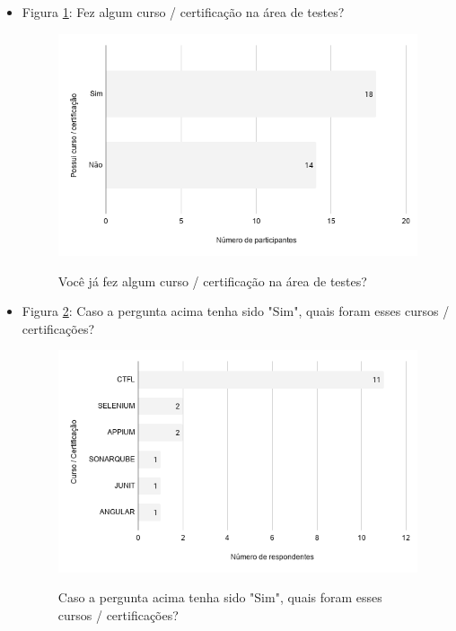 \begin{itemize}
    
    \item Figura \ref{figure:s_certificacao}: Fez algum curso / certificação na área de testes?
        \begin{figure}[!htb]
        \centering
        \includegraphics[width=.80\textwidth]{images/s_certificacao.png}
        \label{figure:s_certificacao}
        \caption{Você já fez algum curso / certificação na área de testes?}
        \end{figure}
    
    
    \item Figura \ref{figure:s_certificacaodesc}: Caso a pergunta acima tenha sido "Sim", quais foram esses cursos / certificações?
        \begin{figure}[!htb]
        \centering
        \includegraphics[width=.80\textwidth]{images/s_certificacaodesc.png}
        \label{figure:s_certificacaodesc}
        \caption{Caso a pergunta acima tenha sido "Sim", quais foram esses cursos / certificações?}
        \end{figure}
    

\end{itemize}
